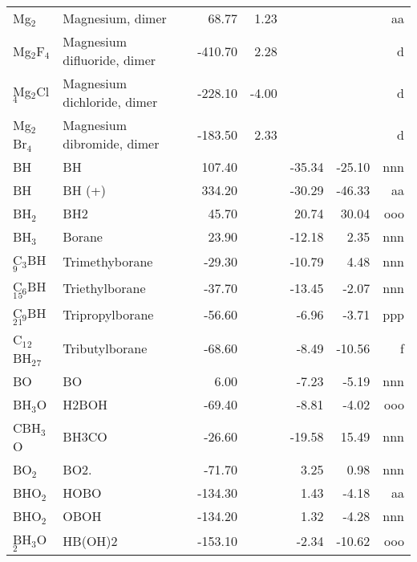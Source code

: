\begin{table}
\begin{center}
\begin{tabular}{llrrrrr}
 Mg$_2$         & Magnesium, dimer                &    68.77    &     1.23  &  &  &     aa\\
 Mg$_2$F$_4$       & Magnesium difluoride, dimer     &  -410.70    &     2.28  &  &  &      d\\
 Mg$_2$Cl$_4$      & Magnesium dichloride, dimer     &  -228.10    &    -4.00  &  &  &      d\\
 Mg$_2$Br$_4$      & Magnesium dibromide, dimer      &  -183.50    &     2.33  &  &  &      d\\
 BH          & BH                             &   107.40    &  &   -35.34  &   -25.10  &    nnn\\
 BH          & BH (+)                         &   334.20    &  &   -30.29  &   -46.33  &     aa\\
 BH$_2$         & BH2                            &    45.70    &  &    20.74  &    30.04  &    ooo\\
 BH$_3$         & Borane                         &    23.90    &  &   -12.18  &     2.35  &    nnn\\
 C$_3$BH$_9$       & Trimethyborane                 &   -29.30    &  &   -10.79  &     4.48  &    nnn\\
 C$_6$BH$_1$$_5$      & Triethylborane                 &   -37.70    &  &   -13.45  &    -2.07  &    nnn\\
 C$_9$BH$_2$$_1$      & Tripropylborane                &   -56.60    &  &    -6.96  &    -3.71  &    ppp\\
 C$_1$$_2$BH$_2$$_7$     & Tributylborane                 &   -68.60    &  &    -8.49  &   -10.56  &      f\\
 BO          & BO                             &     6.00    &  &    -7.23  &    -5.19  &    nnn\\
 BH$_3$O        & H2BOH                          &   -69.40    &  &    -8.81  &    -4.02  &    ooo\\
 CBH$_3$O       & BH3CO                          &   -26.60    &  &   -19.58  &    15.49  &    nnn\\
 BO$_2$         & BO2.                           &   -71.70    &  &     3.25  &     0.98  &    nnn\\
 BHO$_2$        & HOBO                           &  -134.30    &  &     1.43  &    -4.18  &     aa\\
 BHO$_2$        & OBOH                           &  -134.20    &  &     1.32  &    -4.28  &    nnn\\
 BH$_3$O$_2$       & HB(OH)2                        &  -153.10    &  &    -2.34  &   -10.62  &    ooo\\

\end{tabular}
\end{center}
\end{table}
